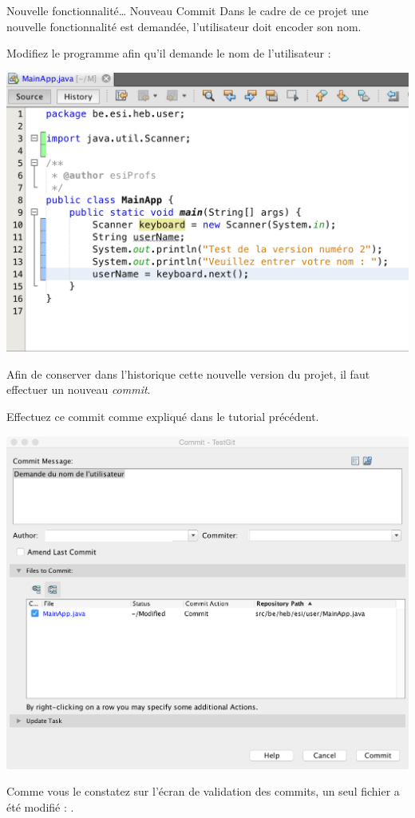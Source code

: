 \documentclass[a4paper,11pt]{style-esi/td}
\begin{document}
\begin{Tutoriel}{Nouvelle fonctionnalité\dots{} Nouveau Commit}
	Dans le cadre de ce projet une nouvelle fonctionnalité est demandée,
	l'utilisateur doit encoder son nom.
	\begin{steps}
	\item 
		Modifiez le programme afin qu'il demande le nom de l'utilisateur :
		\begin{center}
			\includegraphics[width=.7\textwidth]{image/NetBeans_Project_03.png}
		\end{center}
	\end{steps}
	Afin de conserver dans l'historique cette nouvelle version du projet, 
	il faut effectuer un nouveau \emph{commit}.
	\begin{steps}
	\item 
		Effectuez ce commit comme expliqué dans le tutorial précédent.
		\begin{center}
			\includegraphics[width=.7\textwidth]{image/NetBeans_Project_031.png}
		\end{center}
	\end{steps}
	Comme vous le constatez sur l'écran de validation des commits, 
	un seul fichier a été modifié : .
\end{Tutoriel}
\end{document}
